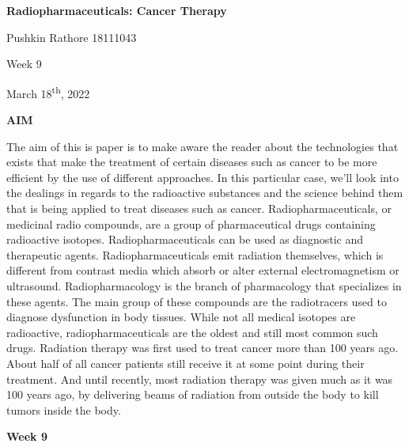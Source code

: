 \documentclass[
]{article}
\author{}
\date{}
\begin{document}
\textbf{{Radiopharmaceuticals: Cancer Therapy}}

Pushkin Rathore 18111043

Week 9

March 18\textsuperscript{th}, 2022

\textbf{AIM}

The aim of this is paper is to make aware the reader about the
technologies that exists that make the treatment of certain diseases
such as cancer to be more efficient by the use of different approaches.
In this particular case, we'll look into the dealings in regards to the
radioactive substances and the science behind them that is being applied
to treat diseases such as cancer. Radiopharmaceuticals, or medicinal
radio compounds, are a group of pharmaceutical drugs containing
radioactive isotopes. Radiopharmaceuticals can be used as diagnostic and
therapeutic agents. Radiopharmaceuticals emit radiation themselves,
which is different from contrast media which absorb or alter external
electromagnetism or ultrasound. Radiopharmacology is the branch of
pharmacology that specializes in these agents. The main group of these
compounds are the radiotracers used to diagnose dysfunction in body
tissues. While not all medical isotopes are radioactive,
radiopharmaceuticals are the oldest and still most common such drugs.
Radiation therapy was first used to treat cancer more than 100 years
ago. About half of all cancer patients still receive it at some point
during their treatment. And until recently, most radiation therapy was
given much as it was 100 years ago, by delivering beams of radiation
from outside the body to kill tumors inside the body.

\textbf{Week 9}
\end{document}
